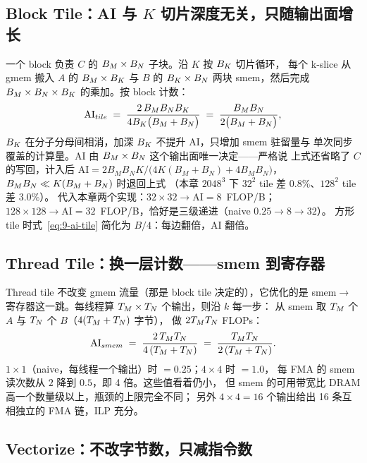 \subsection{Block Tile：AI 与 $K$ 切片深度无关，只随输出面增长}

一个 block 负责 $C$ 的 $B\sb{M} \times B\sb{N}$ 子块。沿 $K$ 按 $B\sb{K}$ 切片循环，
每个 k-slice 从 gmem 搬入 $A$ 的 $B\sb{M} \times B\sb{K}$ 与 $B$ 的 $B\sb{K} \times B\sb{N}$
两块 smem，然后完成 $B\sb{M} \times B\sb{N} \times B\sb{K}$ 的乘加。按 block 计数：
\begin{equation}
  \mathrm{AI}\sb{tile}
  \;=\; \frac{2\, B\sb{M} B\sb{N} B\sb{K}}
             {4 B\sb{K} \bigl( B\sb{M} + B\sb{N} \bigr)}
  \;=\; \frac{B\sb{M} B\sb{N}}{2 \bigl( B\sb{M} + B\sb{N} \bigr)} ,
  \label{eq:9-ai-tile}
\end{equation}
$B\sb{K}$ 在分子分母间相消，加深 $B\sb{K}$ 不提升 AI，只增加 smem 驻留量与
单次同步覆盖的计算量。AI 由 $B\sb{M} \times B\sb{N}$ 这个输出面唯一决定——严格说
上式还省略了 $C$ 的写回，计入后
$\mathrm{AI}=2B_MB_NK/\bigl(4K(B_M+B_N)+4B_MB_N\bigr)$，$B\sb{M}B\sb{N} \ll K(B\sb{M}+B\sb{N})$ 时退回上式
（本章 $2048^3$ 下 $32^2$ tile 差 $0.8\%$、$128^2$ tile 差 $3.0\%$）。
代入本章两个实现：$32 \times 32 \to \mathrm{AI} = 8$~FLOP/B；
$128 \times 128 \to \mathrm{AI} = 32$~FLOP/B，恰好是三级递进（naive $0.25 \to 8 \to 32$）。
方形 tile 时式~\ref{eq:9-ai-tile} 简化为 $B/4$：每边翻倍，AI 翻倍。

\subsection{Thread Tile：换一层计数——smem 到寄存器}

Thread tile 不改变 gmem 流量（那是 block tile 决定的），它优化的是
smem$\to$寄存器这一跳。每线程算 $T\sb{M} \times T\sb{N}$ 个输出，则沿 $k$ 每一步：
从 smem 取 $T\sb{M}$ 个 $A$ 与 $T\sb{N}$ 个 $B$（$4(T\sb{M} + T\sb{N})$ 字节），
做 $2 T\sb{M} T\sb{N}$ FLOPs：
\begin{equation}
  \mathrm{AI}\sb{smem}
  \;=\; \frac{2\, T\sb{M} T\sb{N}}{4\,(T\sb{M} + T\sb{N})}
  \;=\; \frac{T\sb{M} T\sb{N}}{2\,(T\sb{M} + T\sb{N})} .
  \label{eq:9-ai-thread}
\end{equation}
$1 \times 1$（naive，每线程一个输出）时 $= 0.25$；$4 \times 4$ 时 $= 1.0$，
每 FMA 的 smem 读次数从 $2$ 降到 $0.5$，即 4 倍。这些值看着仍小，
但 smem 的可用带宽比 DRAM 高一个数量级以上，瓶颈的上限完全不同；
另外 $4 \times 4 = 16$ 个输出给出 16 条互相独立的 FMA 链，ILP 充分。

\subsection{Vectorize：不改字节数，只减指令数}


